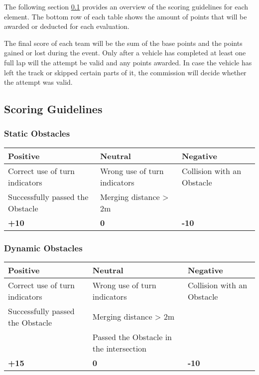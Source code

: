 {	The following section \ref{obstacle_scoring_guidelines} provides an overview of
	the scoring guidelines for each element. The bottom row of each table shows the
	amount of points that will be awarded or deducted for each evaluation.

	The final score of each team will be the sum of the base points and the points
	gained or lost during the event. Only after a vehicle has completed at least
	one full lap will the attempt be valid and any points awarded. In case the
	vehicle has left the track or skipped certain parts of it, the commission will
	decide whether the attempt was valid.

	\subsection{Scoring Guidelines}
	\label{obstacle_scoring_guidelines}

	\subsubsection*{Static Obstacles}
	\begin{table}[H]
		\begin{tabularx}{\textwidth}{XXX}
			\toprule
			\textbf{Positive}                & \textbf{Neutral}             & \textbf{Negative}          \\
			\midrule
			Correct use of turn indicators   & Wrong use of turn indicators & Collision with an Obstacle \\
			Successfully passed the Obstacle & Merging distance > 2m        &                            \\
			\topstrut
			\textbf{+10}                     & \textbf{0}                   & \textbf{-10}               \\
			\bottomrule
		\end{tabularx}
	\end{table}

	\subsubsection*{Dynamic Obstacles}
	\begin{table}[H]
		\begin{tabularx}{\textwidth}{XXX}
			\toprule
			\textbf{Positive}                & \textbf{Neutral}                        & \textbf{Negative}          \\
			\midrule
			Correct use of turn indicators   & Wrong use of turn indicators            & Collision with an Obstacle \\
			Successfully passed the Obstacle & Merging distance > 2m                   &                            \\
			                                 & Passed the Obstacle in the intersection &                            \\
			\topstrut
			\textbf{+15}                     & \textbf{0}                              & \textbf{-10}               \\
			\bottomrule
		\end{tabularx}
	\end{table}

}
